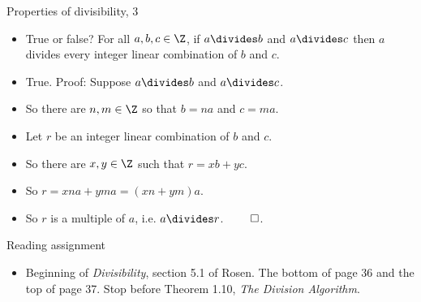 \documentclass{beamer}
\begin{document}
\begin{frame}{Properties of divisibility, 3}

\begin{itemize}
  \item True or false? For all $a,b,c\in\Z$, if $a\divides b$ and $a\divides c$
  then $a$ divides every integer linear combination of $b$ and $c$.
  \item True. Proof: Suppose $a\divides b$ and $a\divides c$.
  \item So there are $n,m\in\Z$ so that $b=na$ and $c=ma$.
  \item Let $r$ be an integer linear combination of $b$ and $c$.
  \item So there are $x,y\in\Z$ such that $r=xb+yc$.
  \item So $r=xna + yma = (xn + ym)a$.
  \item So $r$ is a multiple of $a$, i.e. $a\divides r$. $\qed$.
\end{itemize}

\end{frame}

\begin{frame}{Reading assignment}

\begin{itemize}
  \item Beginning of \emph{Divisibility}, section 5.1 of Rosen. The bottom
  of page 36 and the top of page 37. Stop before Theorem 1.10,
  \emph{The Division Algorithm}.
\end{itemize}

\end{frame}
\end{document}

